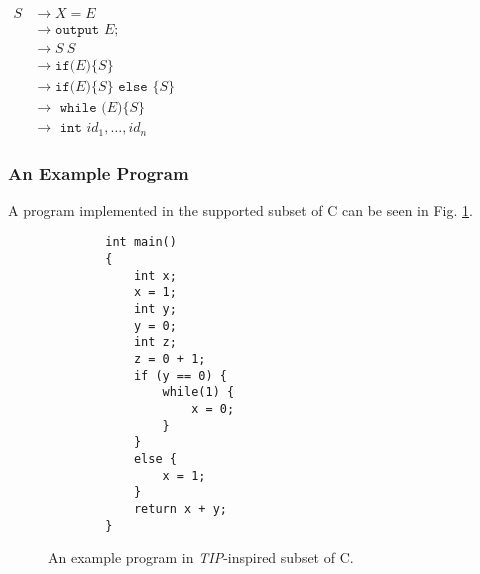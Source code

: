 $
\begin{aligned} S & \rightarrow X = E \\
& \rightarrow \texttt {output } E ; \\ 
& \rightarrow S\:S \\ 
& \rightarrow \texttt{if(}E\texttt{)}\{S\} \\ 
& \rightarrow \texttt{if(} E \texttt{)}\{S\} \texttt { else }\{S\} \\ 
& \rightarrow \texttt { while (}E\texttt{)}\{S\} \\ 
& \rightarrow \texttt { int } i d_{1}, \ldots, i d_{n} 
\end{aligned}
$

\subsubsection{An Example Program}
A program implemented in the supported subset of C can be seen in Fig. \ref{exampleprogram}.

\begin{figure}[H]
    \centering
    \begin{verbatim}
        int main()
        {
            int x;
            x = 1;
            int y;
            y = 0;
            int z;
            z = 0 + 1;
            if (y == 0) {
                while(1) {
                    x = 0;
                }
            }
            else {
                x = 1;
            }
            return x + y;
        }
    \end{verbatim}
    \caption{An example program in \textit{TIP}-inspired subset of C.}
    \label{exampleprogram}
\end{figure}

